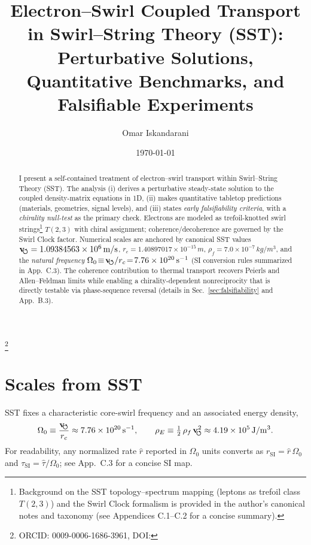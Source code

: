 \documentclass[aps,prb,preprint,amsmath,amssymb]{revtex4-2} %
\newcommand{\vswirlVal}{1.09384563\times10^{6}} %
\newcommand{\rcVal}{1.40897017\times10^{-15}} %
\newcommand{\rhoFVal}{7.0\times10^{-7}} %
\newcommand{\vswirl}{\mathbf{v}_{\!\mkern-2mu\scriptstyle\boldsymbol{\circlearrowleft}}}
\newcommand{\rc}{r_c}
\newcommand{\rhoF}{\rho_{f}}
\newcommand{\rhoE}{\rho_{E}}
\begin{document}
    \title{Electron--Swirl Coupled Transport in Swirl--String Theory (SST):\\
    Perturbative Solutions, Quantitative Benchmarks, and Falsifiable Experiments}

    \author{Omar Iskandarani}
    \thanks{ORCID: 0009-0006-1686-3961, DOI: \paperdoi}
    \date{\today}

    \begin{abstract}
        I present a self-contained treatment of electron–swirl transport within Swirl–String Theory (SST). The analysis (i) derives a perturbative steady-state solution to the coupled density-matrix equations in 1D, (ii) makes quantitative tabletop predictions (materials, geometries, signal levels), and (iii) states \emph{early falsifiability criteria}, with a \emph{chirality null-test} as the primary check. Electrons are modeled as trefoil-knotted swirl strings\footnote{Background on the SST topology–spectrum mapping (leptons as trefoil class $T(2,3)$) and the Swirl Clock formalism is provided in the author’s canonical notes and taxonomy (see Appendices C.1–C.2 for a concise summary).} $T(2,3)$ with chiral assignment; coherence/decoherence are governed by the Swirl Clock factor. Numerical scales are anchored by canonical SST values $\vswirl=\vswirlVal\,\si{m/s}$, $\rc=\rcVal\,\si{m}$, $\rhoF=\rhoFVal\,\si{kg/m^3}$, and the \emph{natural frequency} $\Omega_0\!\equiv\!\vswirl/\rc\!=\!7.76\times10^{20}\,\si{s^{-1}}$ (SI conversion rules summarized in App.~C.3). The coherence contribution to thermal transport recovers Peierls and Allen–Feldman limits while enabling a chirality-dependent nonreciprocity that is directly testable via phase-sequence reversal (details in Sec.~\ref{sec:falsifiability} and App.~B.3).
    \end{abstract}

    \maketitle

    \section{Scales from SST}
        SST fixes a characteristic core-swirl frequency and an associated energy density,
        \begin{align}
            \Omega_0 \equiv \frac{\vswirl}{\rc} \approx 7.76\times10^{20}\,\si{s^{-1}},\qquad
            \rhoE \equiv \tfrac12\,\rhoF\,\vswirl^2 \approx 4.19\times10^{5}\,\si{J/m^3}.
        \end{align}
        For readability, any normalized rate $\hat r$ reported in $\Omega_0$ units converts as $r_\textrm{SI}=\hat r\,\Omega_0$ and $\tau_\textrm{SI}=\hat \tau/\Omega_0$; see App.~C.3 for a concise SI map.
\end{document}
